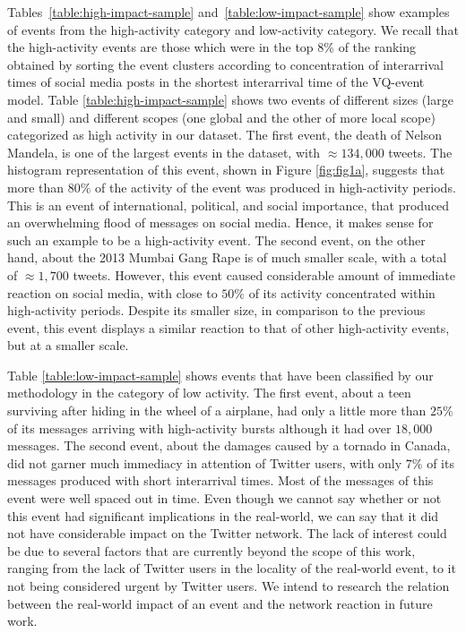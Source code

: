 \documentclass[10pt,letterpaper]{article}
\begin{document}
Tables~\ref{table:high-impact-sample}
and~\ref{table:low-impact-sample} show examples of events from the
high-activity category and low-activity category. We recall that the
high-activity events are those which were in the top 8\% of the
ranking obtained by sorting the event clusters according to
concentration of interarrival times of social media posts in the
shortest interarrival time of the VQ-event model.  Table
\ref{table:high-impact-sample} shows two events of different sizes
(large and small) and different scopes (one global and the other of
more local scope) categorized as high activity in our dataset. The
first event, the death of Nelson Mandela, is one of the largest events
in the dataset, with $\approx 134,000$ tweets. The histogram
representation of this event, shown in Figure \ref{fig:fig1a}, suggests
that more than $80\%$ of the activity of the event was produced in
high-activity periods.  This is an event of international, political,
and social importance, that produced an overwhelming flood of messages
on social media. %
Hence, it makes
sense for such an example to be a high-activity event.  The second
event, on the other hand, about the 2013 Mumbai Gang Rape is of much
smaller scale, with a total of $\approx 1,700$ tweets.  However, this
event caused considerable amount of immediate reaction on social
media, with close to $50\%$ of its activity concentrated within
high-activity periods. Despite its smaller size, in comparison to the
previous event, this event displays a similar reaction to that of
other high-activity events, but at a smaller scale. 

Table \ref{table:low-impact-sample} shows events that have been
classified by our methodology in the category of low activity.  The
first event, about a teen surviving after hiding in the wheel of a
airplane, had only a little more than $25\%$ of its messages arriving
with high-activity bursts although it had over $18,000$ messages.  The
second event, about the damages caused by a tornado in Canada, did not
garner much immediacy in attention of Twitter users, with only $7\%$
of its messages produced with short interarrival times. Most of the
messages of this event were well spaced out in time. Even though we
cannot say whether or not this event had significant implications in
the real-world, we can say that it did not have considerable impact on
the Twitter network. The lack of interest could be due to several
factors that are currently beyond the scope of this work, ranging from
the lack of Twitter users in the locality of the real-world event, to
it not being considered urgent by Twitter users. We intend to research
the relation between the real-world impact of an event and the network
reaction in future work.
\end{document}

